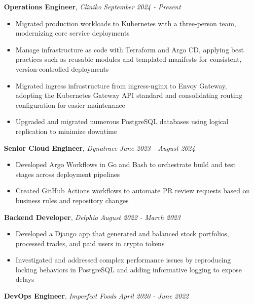 \documentclass[a4paper,9pt]{extarticle}
\newenvironment{changemargin}[2]{%
  \begin{list}{}{%
    \setlength{\topsep}{0pt}%
    \setlength{\leftmargin}{#1}%
    \setlength{\rightmargin}{#2}%
    \setlength{\listparindent}{\parindent}%
    \setlength{\itemindent}{\parindent}%
    \setlength{\parsep}{\parskip}%
  }%
  \item[]}{\end{list}
}
\newenvironment{body} {
	\vspace*{-10pt}
	\begin{changemargin}{-0.25in}{-0.5in}
  }	
	{\end{changemargin}
}
\begin{document}
\begin{body}
	\vspace{12pt}
        \textbf{Operations Engineer}, \emph{Cliniko} \hfill \emph{September 2024 - Present}\\
	\vspace*{0pt}
	\begin{itemize} \itemsep 3pt  %
		\item  Migrated production workloads to Kubernetes with a three-person team, modernizing core service deployments
		\item  Manage infrastructure as code with Terraform and Argo CD, applying best practices such as reusable modules and templated manifests for consistent, version-controlled deployments
		\item  Migrated ingress infrastructure from ingress-nginx to Envoy Gateway, adopting the Kubernetes Gateway API standard and consolidating routing configuration for easier maintenance
		\item  Upgraded and migrated numerous PostgreSQL databases using logical replication to minimize downtime
	\end{itemize}
        \textbf{Senior Cloud Engineer}, \emph{Dynatrace} \hfill \emph{June 2023 - August 2024}\\
	\vspace*{0pt}
	\begin{itemize} \itemsep 3pt  %
		\item  Developed Argo Workflows in Go and Bash to orchestrate build and test stages across deployment pipelines
        \item  Created GitHub Actions workflows to automate PR review requests based on business rules and repository changes
	\end{itemize}
        \textbf{Backend Developer}, \emph{Delphia} \hfill \emph{August 2022 - March 2023}\\
	\vspace*{0pt}
	\begin{itemize} \itemsep 3pt  %
		\item  Developed a Django app that generated and balanced stock portfolios, processed trades, and paid users in crypto tokens
        \item  Investigated and addressed complex performance issues by reproducing locking behaviors in PostgreSQL and adding informative logging to expose delays
	\end{itemize}
        \textbf{DevOps Engineer}, \emph{Imperfect Foods} \hfill \emph{April 2020 - June 2022}\\

\end{body}
\end{document}
